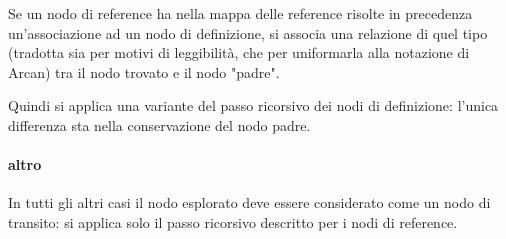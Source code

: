 Se un nodo di reference ha nella mappa delle reference risolte in precedenza un'associazione ad un nodo di definizione, si associa una relazione di quel tipo (tradotta sia per motivi di leggibilit\`a, che per uniformarla alla notazione di Arcan) tra il nodo trovato e il nodo "padre".

Quindi si applica una variante del passo ricorsivo dei nodi di definizione: l'unica differenza sta nella conservazione del nodo padre.

\paragraph{altro}

In tutti gli altri casi il nodo esplorato deve essere considerato come un nodo di transito: si applica solo il passo ricorsivo descritto per i nodi di reference.

